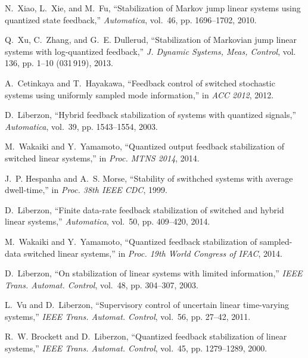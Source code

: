 \documentclass[letterpaper, 11pt, onecolumn]{ieeeconf}  \IEEEoverridecommandlockouts
\begin{document}
\begin{thebibliography}{10}
N.~Xiao, L.~Xie, and M.~Fu, ``{Stabilization of Markov jump linear systems
  using quantized state feedback},'' \emph{Automatica}, vol.~46, pp.
  1696--1702, 2010.

Q.~Xu, C.~Zhang, and G.~E. Dullerud, ``{Stabilization of Markovian jump linear
  systems with log-quantized feedback},'' \emph{J. Dynamic Systems, Meas,
  Control}, vol. 136, pp. 1--10 (031\,919), 2013.

A.~Cetinkaya and T.~Hayakawa, ``{Feedback control of switched stochastic
  systems using uniformly sampled mode information},'' in \emph{ACC 2012},
  2012.

D.~Liberzon, ``Hybrid feedback stabilization of systems with quantized
  signals,'' \emph{Automatica}, vol.~39, pp. 1543--1554, 2003.

M.~Wakaiki and Y.~Yamamoto, ``{Quantized output feedback stabilization of
  switched linear systems},'' in \emph{Proc. MTNS 2014}, 2014.

J.~P. Hespanha and A.~S. Morse, ``Stability of swithched systems with average
  dwell-time,'' in \emph{Proc. 38th IEEE CDC}, 1999.

D.~Liberzon, ``Finite data-rate feedback stabilization of switched and hybrid
  linear systems,'' \emph{Automatica}, vol.~50, pp. 409--420, 2014.

M.~Wakaiki and Y.~Yamamoto, ``{Quantized feedback stabilization of sampled-data
  switched linear systems},'' in \emph{Proc. 19th World Congress of IFAC},
  2014.

D.~Liberzon, ``On stabilization of linear systems with limited information,''
  \emph{IEEE Trans. Automat. Control}, vol.~48, pp. 304--307, 2003.

L.~Vu and D.~Liberzon, ``Supervisory control of uncertain linear time-varying
  systems,'' \emph{IEEE Trans. Automat. Control}, vol.~56, pp. 27--42, 2011.

R.~W. Brockett and D.~Liberzon, ``Quantized feedback stabilization of linear
  systems,'' \emph{IEEE Trans. Automat. Control}, vol.~45, pp. 1279--1289,
  2000.

\end{thebibliography}
\end{document}

